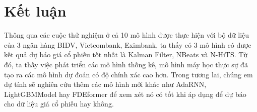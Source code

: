 \section{Kết luận}
Thông qua các cuộc thử nghiệm ở cả 10 mô hình được thực hiện với bộ dữ liệu của 3 ngân hàng BIDV, Vietcombank, Eximbank, ta thấy có 3 mô hình có được kết quả dự báo giá cổ phiếu tốt nhất là Kalman Filter, NBeats và N-HiTS. Từ đó, ta thấy việc phát triển các mô hình thống kê, mô hình máy học thực sự đã tạo ra các mô hình dự đoán có độ chính xác cao hơn. Trong tương lai, chúng em dự tính sẽ nghiên cứu thêm các mô hình mới khác như AdaRNN, LightGBMModel hay FDEformer để xem xét nó có tốt khi áp dụng để dự báo cho dữ liệu giá cổ phiếu hay không.
